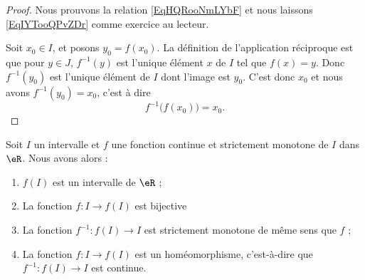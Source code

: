 \begin{proof}
    Nous prouvons la relation \eqref{EqHQRooNmLYbF} et nous laissons \eqref{EqIYTooQPvZDr} comme exercice au lecteur.

    Soit \( x_0\in I\), et posons \( y_0=f(x_0)\). La définition de l'application réciproque est que pour \( y\in J\), \( f^{-1}(y)\) est l'unique élément \( x\) de \( I\) tel que \( f(x)=y\). Donc \( f^{-1}(y_0)\) est l'unique élément de \( I\) dont l'image est \( y_0\). C'est donc \( x_0\) et nous avons \( f^{-1}(y_0)=x_0\), c'est à dire
    \begin{equation}
        f^{-1}\big( f(x_0) \big)=x_0.
    \end{equation}
\end{proof}

\begin{theorem} \label{ThoKBRooQKXThd}
    Soit $I$ un intervalle et $f$ une fonction continue et strictement monotone de $I$ dans \( \eR\). Nous avons alors :
    \begin{enumerate}
        \item
            $f(I)$ est un intervalle de \( \eR\) ;
        \item
            La fonction \( f\colon I\to f(I)\) est bijective
        \item
            La fonction \( f^{-1}\colon f(I)\to I\) est strictement monotone de même sens que $f$ ;
        \item \label{ItemEJZooKuFoeFiv}
            La fonction \( f\colon I\to f(I)\) est un homéomorphisme, c'est-à-dire que \( f^{-1}\colon f(I)\to I\) est continue.
    \end{enumerate}
\end{theorem}

